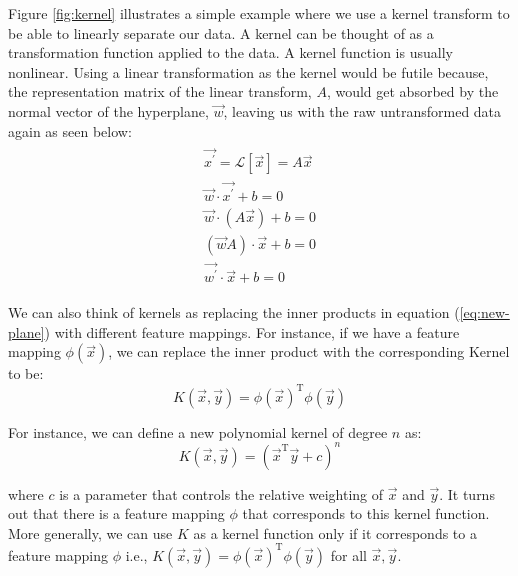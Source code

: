 Figure \ref{fig:kernel} illustrates a simple example where we use a kernel transform to be able to linearly separate our data. A kernel can be thought of as a transformation function applied to the data. A kernel function is usually nonlinear. Using a linear transformation as the kernel would be futile because, the representation matrix of the linear transform, $A$, would get absorbed by the normal vector of the hyperplane, $\vec{w}$, leaving us with the raw untransformed data again as seen below:
\begin{gather}
\begin{aligned}
	\vec{x^{'}} = \mathcal{L}[\vec{x}] = A\vec{x} \nonumber\\
	\vec{w}\cdot\vec{x^{'}} + b = 0 \nonumber\\
	\vec{w}\cdot (A\vec{x}) + b = 0 \nonumber\\
	(\vec{w}A)\cdot\vec{x} + b = 0 \nonumber\\
	\vec{w^{'}}\cdot\vec{x} + b = 0
\end{aligned}
\end{gather}

We can also think of kernels as replacing the inner products in equation (\ref{eq:new-plane}) with different feature mappings. For instance, if we have a feature mapping $\phi(\vec{x})$, we can replace the inner product with the corresponding Kernel to be:
\begin{equation*}
K(\vec{x}, \vec{y}) = \phi(\vec{x})^{\text{T}}\phi(\vec{y})
\end{equation*}

For instance, we can define a new polynomial kernel of degree $n$ as:
\begin{equation*}
K(\vec{x}, \vec{y}) = (\vec{x}^{\text{T}}\vec{y} + c)^n
\end{equation*}

where $c$ is a parameter that controls the relative weighting of $\vec{x}$ and $\vec{y}$. It turns out that there is a feature mapping $\phi$ that corresponds to this kernel function. More generally, we can use $K$ as a kernel function only if it corresponds to a feature mapping $\phi$ i.e., $K(\vec{x}, \vec{y}) = \phi(\vec{x})^{\text{T}}\phi(\vec{y})$ for all $\vec{x}, \vec{y}$.

